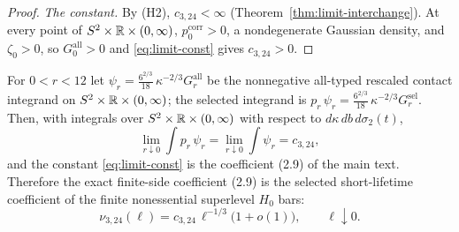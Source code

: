 \begin{proof}
\emph{The constant.} By (H2), $c_{3,24}<\infty$ (Theorem~\ref{thm:limit-interchange}). At every point of $S^2\times\mathbb R\times(0,\infty)$, $p^{\mathrm{corr}}_0>0$, a nondegenerate Gaussian density, and $\zeta_0>0$, so $G^{\mathrm{all}}_0>0$ and \eqref{eq:limit-const} gives $c_{3,24}>0$.
\end{proof}

\begin{corollary}\label{cor:limit-coefficient}
For $0<r<12$ let $\psi_r=\frac{6^{2/3}}{18}\,\kappa^{-2/3}G^{\mathrm{all}}_r$ be the nonnegative all-typed rescaled contact integrand on $S^2\times\mathbb R\times(0,\infty)$; the selected integrand is $p_r\,\psi_r=\frac{6^{2/3}}{18}\,\kappa^{-2/3}G^{\mathrm{sel}}_r$. Then, with integrals over $S^2\times\mathbb R\times(0,\infty)$ with respect to $d\kappa\,db\,d\sigma_2(t)$,
\begin{equation}\label{eq:limit-ident}
\lim_{r\downarrow0}\int p_r\,\psi_r=\lim_{r\downarrow0}\int\psi_r=c_{3,24},
\end{equation}
and the constant \eqref{eq:limit-const} is the coefficient (2.9) of the main text. Therefore the exact finite-side coefficient (2.9) is the selected short-lifetime coefficient of the finite nonessential superlevel $H_0$ bars:
\begin{equation}\label{eq:limit-law}
\nu_{3,24}(\ell)=c_{3,24}\,\ell^{-1/3}\bigl(1+o(1)\bigr),\qquad\ell\downarrow0 .
\end{equation}
\end{corollary}

